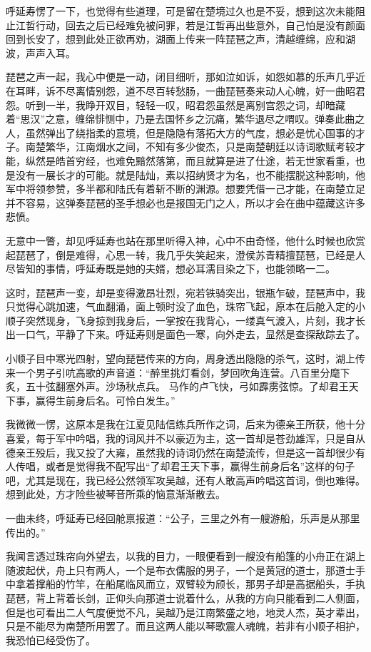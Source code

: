 呼延寿愣了一下，也觉得有些道理，可是留在楚境过久也是不妥，想到这次未能阻止江哲行动，回去之后已经难免被问罪，若是江哲再出些意外，自己怕是没有颜面回到长安了，想到此处正欲再劝，湖面上传来一阵琵琶之声，清越缠绵，应和湖波，声声入耳。

琵琶之声一起，我心中便是一动，闭目细听，那如泣如诉，如怨如慕的乐声几乎近在耳畔，诉不尽离情别怨，道不尽百转愁肠，一曲琵琶奏来动人心魄，好一曲昭君怨。听到一半，我睁开双目，轻轻一叹，昭君怨虽然是离别宫怨之词，却暗藏着“思汉”之意，缠绵悱恻中，乃是去国怀乡之沉痛，繁华退尽之喟叹。弹奏此曲之人，虽然弹出了绕指柔的意境，但是隐隐有落拓大方的气度，想必是忧心国事的才子。南楚繁华，江南烟水之间，不知有多少俊杰，只是南楚朝廷以诗词歌赋考较才能，纵然是皓首穷经，也难免黯然落第，而且就算是进了仕途，若无世家看重，也是没有一展长才的可能。就是陆灿，素以招纳贤才为名，也不能摆脱这种影响，他军中将领参赞，多半都和陆氏有着斩不断的渊源。想要凭借一己才能，在南楚立足并不容易，这弹奏琵琶的圣手想必也是报国无门之人，所以才会在曲中蕴藏这许多悲愤。

无意中一瞥，却见呼延寿也站在那里听得入神，心中不由奇怪，他什么时候也欣赏起琵琶了，倒是难得，心思一转，我几乎失笑起来，澄侯苏青精擅琵琶，已经是人尽皆知的事情，呼延寿既是她的夫婿，想必耳濡目染之下，也能领略一二。

这时，琵琶声一变，却是变得激昂壮烈，宛若铁骑突出，银瓶乍破，琵琶声中，我只觉得心跳加速，气血翻涌，面上顿时没了血色，珠帘飞起，原本在后舱入定的小顺子突然现身，飞身掠到我身后，一掌按在我背心，一缕真气渡入，片刻，我才长出一口气，平静了下来。呼延寿则是面色一寒，向外走去，显然是查探敌踪去了。

小顺子目中寒光四射，望向琵琶传来的方向，周身透出隐隐的杀气，这时，湖上传来一个男子引吭高歌的声音道：“醉里挑灯看剑，梦回吹角连营。八百里分麾下炙，五十弦翻塞外声。沙场秋点兵。 马作的卢飞快，弓如霹雳弦惊。了却君王天下事，赢得生前身后名。可怜白发生。”

我微微一愣，这原本是我在江夏见陆信练兵所作之词，后来为德亲王所获，他十分喜爱，每于军中吟唱，我的词风并不以豪迈为主，这一首却是苍劲雄浑，只是自从德亲王殁后，我又投了大雍，虽然我的诗词仍然在南楚流传，但是这一首却很少有人传唱，或者是觉得我不配写出“了却君王天下事，赢得生前身后名”这样的句子吧，尤其是现在，我已经公然领军攻吴越，还有人敢高声吟唱这首词，倒也难得。想到此处，方才险些被琴音所乘的恼意渐渐散去。

一曲未终，呼延寿已经回舱禀报道：“公子，三里之外有一艘游船，乐声是从那里传出的。”

我闻言透过珠帘向外望去，以我的目力，一眼便看到一艘没有船篷的小舟正在湖上随波起伏，舟上只有两人，一个是布衣儒服的男子，一个是黄冠的道士，那道士手中拿着撑船的竹竿，在船尾临风而立，双臂较为颀长，那男子却是高据船头，手执琵琶，背上背着长剑，正仰头向那道士说着什么，从我的方向只能看到二人侧面，但是也可看出二人气度便觉不凡，吴越乃是江南繁盛之地，地灵人杰，英才辈出，只是不能尽为南楚所用罢了。而且这两人能以琴歌震人魂魄，若非有小顺子相护，我恐怕已经受伤了。

